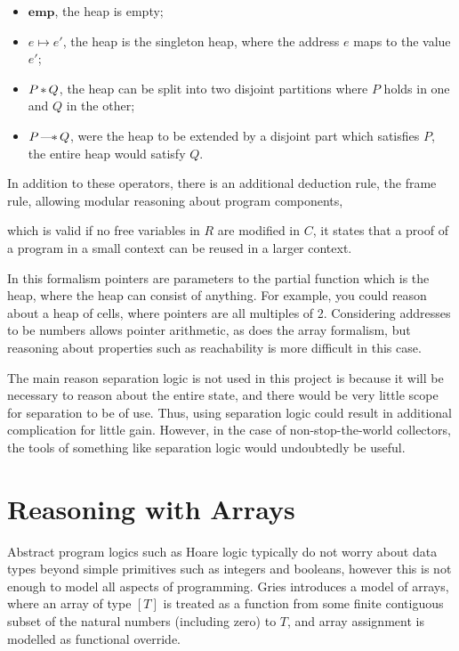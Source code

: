 \begin{itemize}
  \item $\mathbf{emp}$, the heap is empty;

  \item $e \mapsto e'$, the heap is the singleton heap, where the
    address $e$ maps to the value $e'$;

  \item $P \sepc Q$, the heap can be split into two disjoint partitions
    where $P$ holds in one and $Q$ in the other;

  \item $P \sepi Q$, were the heap to be extended by a disjoint part
    which satisfies $P$, the entire heap would satisfy $Q$.
\end{itemize}

In addition to these operators, there is an additional deduction rule,
the frame rule, allowing modular reasoning about program components,
\begin{prooftree}
\end{prooftree}
which is valid if no free variables in $R$ are modified in $C$, it
states that a proof of a program in a small context can be reused in a
larger context.

In this formalism pointers are parameters to the partial function
which is the heap, where the heap can consist of anything. For
example, you could reason about a heap of cells, where pointers are
all multiples of 2. Considering addresses to be numbers allows pointer
arithmetic, as does the array formalism, but reasoning about
properties such as reachability is more difficult in this case.

The main reason separation logic is not used in this project is
because it will be necessary to reason about the entire state, and
there would be very little scope for separation to be of use. Thus,
using separation logic could result in additional complication for
little gain. However, in the case of non-stop-the-world collectors,
the tools of something like separation logic would undoubtedly be
useful.

\section{Reasoning with Arrays}
\label{sec:heap-arrays}

Abstract program logics such as Hoare logic typically do not worry
about data types beyond simple primitives such as integers and
booleans, however this is not enough to model all aspects of
programming. Gries introduces a model of arrays\cite{Gries87}, where
an array of type $[T]$ is treated as a function from some finite
contiguous subset of the natural numbers (including zero) to $T$, and
array assignment is modelled as functional override.

